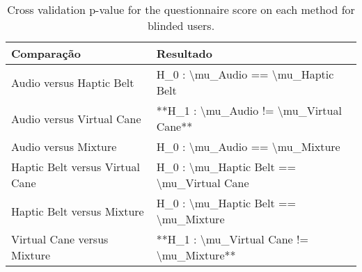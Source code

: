 
\begin{table}[!htb]
\centering
\caption{Cross validation p-value for the questionnaire score on each method for blinded users.}
\label{tab:lsd_sagat}
\begin{tabular}{ll}
\toprule
                     Comparação &                                 Resultado \\
\midrule
       Audio versus Haptic Belt &        H\_0 : \textbackslash mu\_Audio == \textbackslash mu\_Haptic Belt \\
      Audio versus Virtual Cane &   **H\_1 : \textbackslash mu\_Audio != \textbackslash mu\_Virtual Cane** \\
           Audio versus Mixture &            H\_0 : \textbackslash mu\_Audio == \textbackslash mu\_Mixture \\
Haptic Belt versus Virtual Cane & H\_0 : \textbackslash mu\_Haptic Belt == \textbackslash mu\_Virtual Cane \\
     Haptic Belt versus Mixture &      H\_0 : \textbackslash mu\_Haptic Belt == \textbackslash mu\_Mixture \\
    Virtual Cane versus Mixture & **H\_1 : \textbackslash mu\_Virtual Cane != \textbackslash mu\_Mixture** \\
\bottomrule
\end{tabular}
\end{table}

